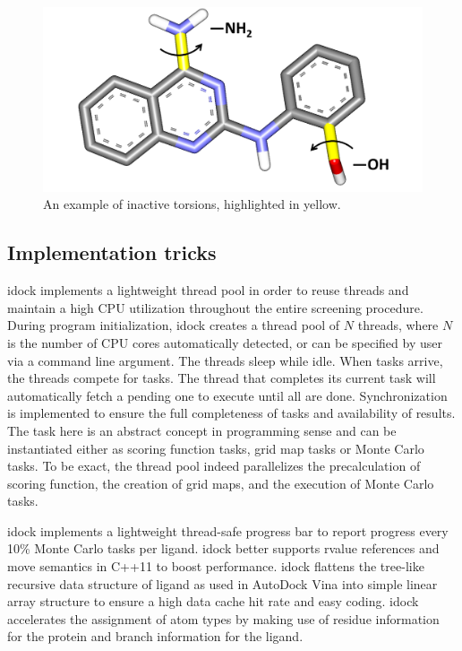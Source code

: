 \begin{figure}
\centering
\includegraphics[width=\linewidth]{../idock/InactiveTorsions.png}
\caption{An example of inactive torsions, highlighted in yellow.}
\label{idock:InactiveTorsions}
\end{figure}

\subsection{Implementation tricks}

idock implements a lightweight thread pool in order to reuse threads and maintain a high CPU utilization throughout the entire screening procedure. During program initialization, idock creates a thread pool of $N$ threads, where $N$ is the number of CPU cores automatically detected, or can be specified by user via a command line argument. The threads sleep while idle. When tasks arrive, the threads compete for tasks. The thread that completes its current task will automatically fetch a pending one to execute until all are done. Synchronization is implemented to ensure the full completeness of tasks and availability of results. The task here is an abstract concept in programming sense and can be instantiated either as scoring function tasks, grid map tasks or Monte Carlo tasks. To be exact, the thread pool indeed parallelizes the precalculation of scoring function, the creation of grid maps, and the execution of Monte Carlo tasks.

idock implements a lightweight thread-safe progress bar to report progress every 10\% Monte Carlo tasks per ligand. idock better supports rvalue references and move semantics in C++11 to boost performance. idock flattens the tree-like recursive data structure of ligand as used in AutoDock Vina into simple linear array structure to ensure a high data cache hit rate and easy coding. idock accelerates the assignment of atom types by making use of residue information for the protein and branch information for the ligand.

